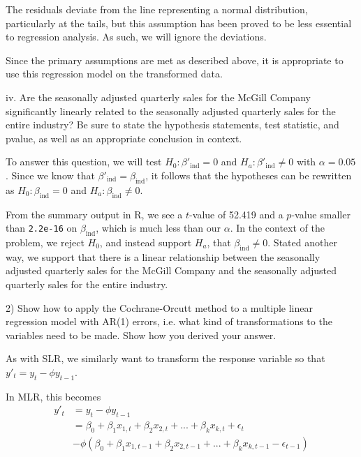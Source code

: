 \documentclass{article}
\begin{document}
\begin{flushleft}
The residuals deviate from the line representing a normal distribution, particularly at the tails, but this assumption has been proved to be less essential to regression analysis. As such, we will ignore the deviations.\newline

Since the primary assumptions are met as described above, it is appropriate to use this regression model on the transformed data.\newline

iv. Are the seasonally adjusted quarterly sales for the McGill Company significantly linearly related to the seasonally adjusted quarterly sales for the entire industry? Be sure to state the hypothesis statements, test statistic, and pvalue, as well as an appropriate conclusion in context.\newline

To answer this question, we will test $H_0: \beta'_{\text{ind}} = 0$ and $H_a: \beta'_{\text{ind}} \neq 0$ with $\alpha=0.05$. Since we know that $\beta'_{\text{ind}}=\beta_{\text{ind}}$, it follows that the hypotheses can be rewritten as $H_0: \beta_{\text{ind}} = 0$ and $H_a: \beta_{\text{ind}} \neq 0$.

From the summary output in R, we see a $t$-value of 52.419 and a $p$-value smaller than \texttt{2.2e-16} on $\beta_{\text{ind}}$, which is much less than our $\alpha$. In the context of the problem, we reject $H_0$, and instead support $H_a$, that $ \beta_{\text{ind}} \neq 0$. Stated another way, we support that there is a linear relationship between the seasonally adjusted quarterly sales for the McGill Company and the seasonally adjusted quarterly sales for the entire industry.\newline

2) Show how to apply the Cochrane-Orcutt method to a multiple linear regression model with AR(1) errors, i.e. what kind of transformations to the variables need to be made. Show how you derived your answer.\newline

As with SLR, we similarly want to transform the response variable so that $y'_t=y_t-\phi y_{t-1}$. \newline

In MLR, this becomes 
\begin{align*}
y'_t&=y_t-\phi y_{t-1}\\
&= \beta_0+\beta_1x_{1,t}+\beta_2x_{2,t}+...+\beta_kx_{k,t}+\epsilon_{t}\\
&-\phi( \beta_0+\beta_1x_{1,t-1}+\beta_2x_{2,t-1}+...+\beta_kx_{k,t-1} - \epsilon_{t-1})\\
\end{align*}


\end{flushleft}
\end{document}
